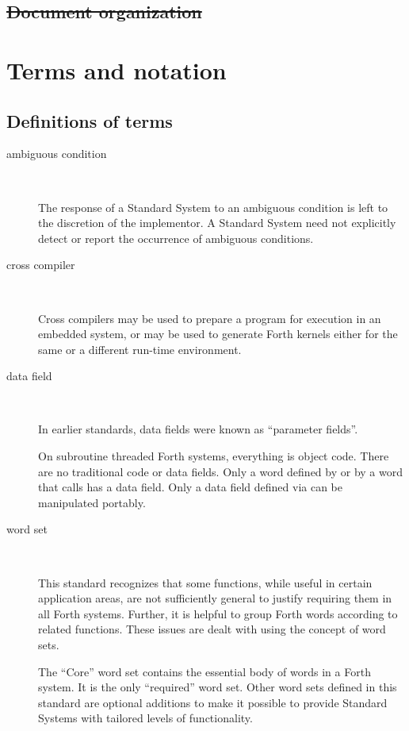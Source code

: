 \cbstart{}
\subsection[Document organization]{\sout{Document organization}} %
\label{doc:org}
\cbend

\section{Terms and notation} %

\subsection{Definitions of terms} %

\begin{description}
\item[ambiguous condition] ~

The response of a Standard System to an ambiguous condition is left
to the discretion of the implementor. A Standard System need not
explicitly detect or report the occurrence of ambiguous conditions.

\item[cross compiler] ~

Cross compilers may be used to prepare a program for execution in an
embedded system, or may be used to generate Forth kernels either for
the same or a different run-time environment.

\item[data field] ~

In earlier standards, data fields were known as ``parameter fields''.

On subroutine threaded Forth systems, everything is object code.
There are no traditional code or data fields. Only a word defined by
 or by a word that calls  has a data field.
Only a data field defined via  can be manipulated portably.

\item[word set] ~

This standard recognizes that some functions, while useful in certain
application areas, are not sufficiently general to justify requiring
them in all Forth systems. Further, it is helpful to group Forth
words according to related functions. These issues are dealt with
using the concept of word sets.

The ``Core'' word set contains the essential body of words in a Forth
system. It is the only ``required'' word set. Other word sets defined
in this standard are optional additions to make it possible to
provide Standard Systems with tailored levels of functionality.
\end{description}

